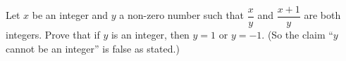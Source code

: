 Let $x$ be an integer and $y$ a non-zero number such that $\dfrac {x}{y}$ and $\dfrac{x+1}{y}$ are both integers. Prove that if $y$ is an integer, then $y=1$ or $y=-1$. (So the claim ``$y$ cannot be an integer'' is false as stated.)
